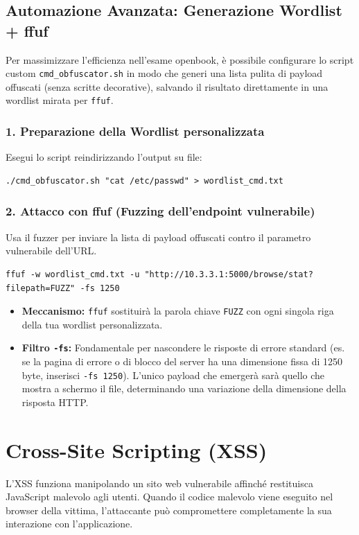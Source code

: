 \documentclass[12pt,a4paper]{report}
\begin{document}
	\subsection{Automazione Avanzata: Generazione Wordlist + ffuf}
	
	Per massimizzare l'efficienza nell'esame openbook, è possibile configurare lo script custom \texttt{cmd\_obfuscator.sh} in modo che generi una lista pulita di payload offuscati (senza scritte decorative), salvando il risultato direttamente in una wordlist mirata per \texttt{ffuf}.
	
	\subsubsection{1. Preparazione della Wordlist personalizzata}
	Esegui lo script reindirizzando l'output su file:
	\begin{lstlisting}[backgroundcolor=\color{codegray}, basicstyle=\ttfamily\small, breaklines=true]
		./cmd_obfuscator.sh "cat /etc/passwd" > wordlist_cmd.txt
	\end{lstlisting}
	
	\subsubsection{2. Attacco con ffuf (Fuzzing dell'endpoint vulnerabile)}
	Usa il fuzzer per inviare la lista di payload offuscati contro il parametro vulnerabile dell'URL.
	\begin{lstlisting}[backgroundcolor=\color{codegray}, basicstyle=\ttfamily\small, breaklines=true]
		ffuf -w wordlist_cmd.txt -u "http://10.3.3.1:5000/browse/stat?filepath=FUZZ" -fs 1250
	\end{lstlisting}
	\begin{itemize}
		\item \textbf{Meccanismo:} \texttt{ffuf} sostituirà la parola chiave \texttt{FUZZ} con ogni singola riga della tua wordlist personalizzata.
		\item \textbf{Filtro \texttt{-fs}:} Fondamentale per nascondere le risposte di errore standard (es. se la pagina di errore o di blocco del server ha una dimensione fissa di 1250 byte, inserisci \texttt{-fs 1250}). L'unico payload che emergerà sarà quello che mostra a schermo il file, determinando una variazione della dimensione della risposta HTTP.
	\end{itemize}
	
	\section{Cross-Site Scripting (XSS)}	
	L'XSS funziona manipolando un sito web vulnerabile affinché restituisca JavaScript malevolo agli utenti. Quando il codice malevolo viene eseguito nel browser della vittima, l'attaccante può compromettere completamente la sua interazione con l'applicazione.
	
\end{document}
